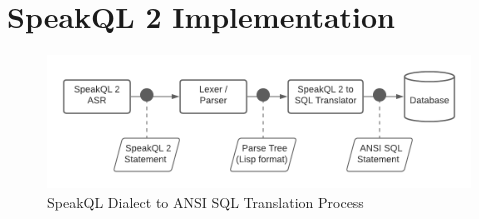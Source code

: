 






\section{SpeakQL 2 Implementation}


\begin{figure}
  \centering
  \includegraphics[width=\linewidth]{figures/SpeakQL 2 to SQL Translation}
  \caption{SpeakQL Dialect to ANSI SQL Translation Process}
\end{figure}

